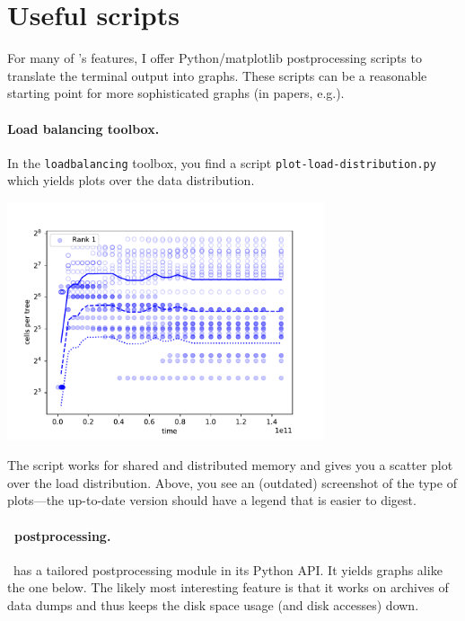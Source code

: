 \section{Useful scripts}

For many of \Peano's features, I offer Python/matplotlib postprocessing scripts
to translate the terminal output into graphs.
These scripts can be a reasonable starting point for more sophisticated graphs
(in papers, e.g.).


\paragraph{Load balancing toolbox.}
%
%
%
In the \texttt{loadbalancing} toolbox, you find a script \linebreak
\texttt{plot-load-distribution.py} which yields 
plots over the data distribution.

\begin{center}
  \includegraphics[width=0.7\textwidth]{80_postprocessing/shared-memory.pdf}
\end{center}

\noindent
The script works for shared and distributed memory and gives you a scatter plot
over the load distribution.
Above, you see an (outdated) screenshot of the type of plots---the up-to-date
version should have a legend that is easier to digest.


\paragraph{\ExaHyPE\ postprocessing.}
%
%
%
\ExaHyPE\ has a tailored postprocessing module in its Python API. It yields
graphs alike the one below.
The likely most interesting feature is that it works on archives of data dumps
and thus keeps the disk space usage (and disk accesses) down.


